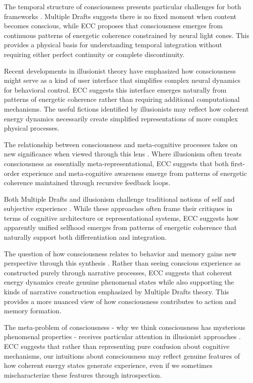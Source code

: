 \begin{refsection}
The temporal structure of consciousness presents particular challenges for both frameworks \cite{Blackmore2002}. Multiple Drafts suggests there is no fixed moment when content becomes conscious, while ECC proposes that consciousness emerges from continuous patterns of energetic coherence constrained by neural light cones. This provides a physical basis for understanding temporal integration without requiring either perfect continuity or complete discontinuity.

Recent developments in illusionist theory \cite{Humphrey2011} have emphasized how consciousness might serve as a kind of user interface that simplifies complex neural dynamics for behavioral control. ECC suggests this interface emerges naturally from patterns of energetic coherence rather than requiring additional computational mechanisms. The useful fictions identified by illusionists may reflect how coherent energy dynamics necessarily create simplified representations of more complex physical processes.

The relationship between consciousness and meta-cognitive processes takes on new significance when viewed through this lens \cite{Rey1995}. Where illusionism often treats consciousness as essentially meta-representational, ECC suggests that both first-order experience and meta-cognitive awareness emerge from patterns of energetic coherence maintained through recursive feedback loops.

Both Multiple Drafts and illusionism challenge traditional notions of self and subjective experience \cite{Thompson2014}. While these approaches often frame their critiques in terms of cognitive architecture or representational systems, ECC suggests how apparently unified selfhood emerges from patterns of energetic coherence that naturally support both differentiation and integration.

The question of how consciousness relates to behavior and memory gains new perspective through this synthesis \cite{Dennett1992}. Rather than seeing conscious experience as constructed purely through narrative processes, ECC suggests that coherent energy dynamics create genuine phenomenal states while also supporting the kinds of narrative construction emphasized by Multiple Drafts theory. This provides a more nuanced view of how consciousness contributes to action and memory formation.

The meta-problem of consciousness - why we think consciousness has mysterious phenomenal properties - receives particular attention in illusionist approaches \cite{Frankish2019}. ECC suggests that rather than representing pure confusion about cognitive mechanisms, our intuitions about consciousness may reflect genuine features of how coherent energy states generate experience, even if we sometimes mischaracterize these features through introspection.


\end{refsection}
